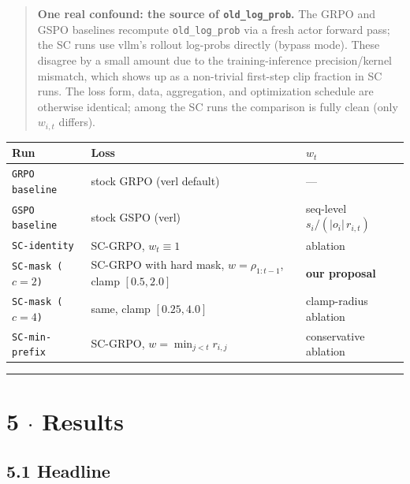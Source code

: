\documentclass[11pt,a4paper]{article}
\theoremstyle{remark}
\begin{document}
\begin{quote}
\textbf{One real confound: the source of \texttt{old\_log\_prob}.} The GRPO and GSPO baselines recompute \texttt{old\_log\_prob} via a fresh actor forward pass; the SC runs use vllm's rollout log-probs directly (bypass mode). These disagree by a small amount due to the training-inference precision/kernel mismatch, which shows up as a non-trivial first-step clip fraction in SC runs. The loss form, data, aggregation, and optimization schedule are otherwise identical; among the SC runs the comparison is fully clean (only $w_{i,t}$ differs).
\end{quote}
\begin{table}[H]\centering\small
\begin{tabularx}{\textwidth}{LLL}
\toprule
\textbf{Run} & \textbf{Loss} & \textbf{$w_t$} \\
\midrule
\texttt{GRPO baseline} & stock GRPO (verl default) & --- \\
\texttt{GSPO baseline} & stock GSPO (verl) & seq-level $s_i / (|o_i|\,r_{i,t})$ \\
\texttt{SC-identity} & SC-GRPO, $w_t\equiv 1$ & ablation \\
\texttt{SC-mask ($c{=}2$)} & SC-GRPO with hard mask, $w=\rho_{1:t-1}$, clamp $[0.5,2.0]$ & \textbf{our proposal} \\
\texttt{SC-mask ($c{=}4$)} & same, clamp $[0.25,4.0]$ & clamp-radius ablation \\
\texttt{SC-min-prefix} & SC-GRPO, $w=\min_{j<t} r_{i,j}$ & conservative ablation \\
\bottomrule
\end{tabularx}
\end{table}

\vspace{0.5em}\hrule\vspace{0.5em}
\section*{5 $\cdot$ Results}

\subsection*{5.1 Headline}
\end{document}
